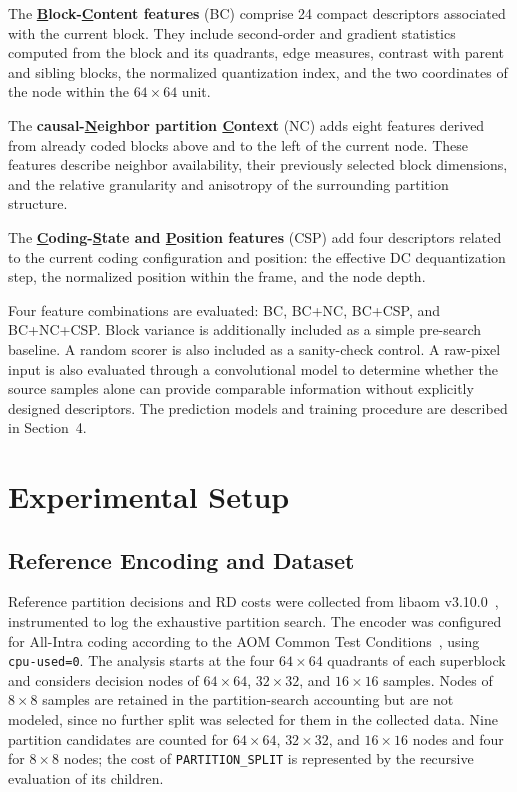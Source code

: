 \documentclass{article}
\begin{document}
The \textbf{\underline{B}lock-\underline{C}ontent features} (BC) comprise 24 compact descriptors associated with the current block. They include second-order and gradient statistics computed from the block and its quadrants, edge measures, contrast with parent and sibling blocks, the normalized quantization index, and the two coordinates of the node within the $64\times64$ unit.

The \textbf{causal-\underline{N}eighbor partition \underline{C}ontext} (NC) adds eight features derived from already coded blocks above and to the left of the current node. These features describe neighbor availability, their previously selected block dimensions, and the relative granularity and anisotropy of the surrounding partition structure.

The \textbf{\underline{C}oding-\underline{S}tate and \underline{P}osition features} (CSP) add four descriptors related to the current coding configuration and position: the effective DC dequantization step, the normalized position within the frame, and the node depth.

Four feature combinations are evaluated: BC, BC+NC, BC+CSP, and BC+NC+CSP. Block variance is additionally included as a simple pre-search baseline. A random scorer is also included as a sanity-check control. A raw-pixel input is also evaluated through a convolutional model to determine whether the source samples alone can provide comparable information without explicitly designed descriptors. The prediction models and training procedure are described in Section~4.

\section{Experimental Setup}

\subsection{Reference Encoding and Dataset}

Reference partition decisions and RD costs were collected from libaom v3.10.0~\cite{aomedia2024libaom}, instrumented to log the exhaustive partition search. The encoder was configured for All-Intra coding according to the AOM Common Test Conditions~\cite{zhao2026aomctc}, using \texttt{cpu-used=0}. The analysis starts at the four $64\times64$ quadrants of each superblock and considers decision nodes of $64\times64$, $32\times32$, and $16\times16$ samples. Nodes of $8\times8$ samples are retained in the partition-search accounting but are not modeled, since no further split was selected for them in the collected data. Nine partition candidates are counted for $64\times64$, $32\times32$, and $16\times16$ nodes and four for $8\times8$ nodes; the cost of \texttt{PARTITION\_SPLIT} is represented by the recursive evaluation of its children.
\end{document}
